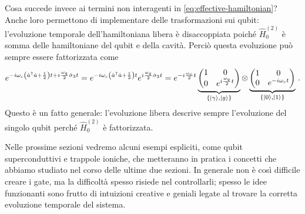\noindent Cosa succede invece ai termini non interagenti in \eqref{eq:effective-hamiltonian}? Anche loro permettono di implementare delle trasformazioni sui qubit: l'evoluzione temporale dell'hamiltoniana libera è disaccoppiata poiché $\hat{H}^{(2)}_0$ è somma delle hamiltoniane del qubit e della cavità. Perciò questa evoluzione può sempre essere fattorizzata come
\begin{equation*}
    e^{-i\omega_c\left(\hat a^\dagger \hat a + \frac 12\right)t + i\frac{\omega_q}{2}\hat \sigma_3t} = e^{-i\omega_c\left(\hat a^\dagger \hat a + \frac 12\right)t}e^{i\frac{\omega_q}{2}\hat \sigma_3t}=
    e^{-i\frac{\omega_c}{2}t}
    \underbrace{\begin{pmatrix}
        1 & 0\\
        0 & e^{i\frac{\omega_q}{2}t}
    \end{pmatrix}
    }_{\{\ket \gamma, \ket g\}}
    \otimes
    \underbrace{
    \begin{pmatrix}
        1 & 0\\
        0 & e^{-i\omega_c t}
    \end{pmatrix}
    }_{\{\ket 0, \ket 1\}} \, .
\end{equation*}
Questo è un fatto generale: l'evoluzione libera descrive sempre l'evoluzione del singolo qubit perché $\hat{H}^{(2)}_0$ è fattorizzata. 

\noindent Nelle prossime sezioni vedremo alcuni esempi espliciti, come qubit superconduttivi e trappole ioniche, che metteranno in pratica i concetti che abbiamo studiato nel corso delle ultime due sezioni. In generale non è così difficile creare i gate, ma la difficoltà spesso risiede nel controllarli; spesso le idee funzionanti sono frutto di intuizioni creative e geniali legate al trovare la corretta evoluzione temporale del sistema. 